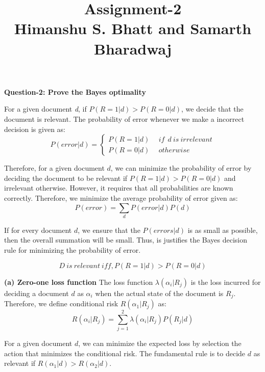 \documentclass[10pt,onecolumn,letterpaper]{article}
\begin{document}
\title{Assignment-2\\
\small{Himanshu S. Bhatt and Samarth Bharadwaj}}
\maketitle
\noindent\textbf{Question-2: Prove the Bayes optimality}

For a given document \emph{d}, if $P(R=1|d) > P(R=0|d)$, we decide that the document is relevant. The probability of error whenever we make a incorrect decision is given as:
\begin{equation}
P(error|d) =\left\{ \begin{array}{cc}
                        P(R=1|d)  & \ \ if \ \  d ~is~ irrelevant \\
                        P(R=0|d)   & \ \ otherwise
                        \end{array} \right.
\end{equation}

\noindent Therefore, for a given document $d$, we can minimize the probability of error by deciding the document to be relevant if $P(R=1|d) > P(R=0|d)$ and irrelevant otherwise. However, it requires that all probabilities are known correctly. Therefore, we minimize the average probability of error given as:
\begin{equation}
P(error)= \sum_d P(error|d) P(d)
\end{equation}

\noindent If for every document $d$, we ensure that the $P(errors|d)$ is as small as possible, then the overall summation will be small. Thus, is justifies the Bayes decision rule for minimizing the probability of error.

\begin{equation}
D ~is ~relevant ~iff, P(R=1|d) > P(R=0|d)
\end{equation}

\vspace{12pt}
\textbf{(a) Zero-one loss function}
The loss function $\lambda(\alpha_i|R_j)$ is the loss incurred for deciding a document $d$ as $\alpha_i$ when the actual state of the document is $R_j$.
Therefore, we define conditional risk $R(\alpha_1|R_j)$ as:
\begin{equation}
R(\alpha_i|R_j)=\sum_{j=1}^2 \lambda(\alpha_i|R_j) P(R_j|d)
\end{equation}

For a given document $d$, we can minimize the expected loss by selection the action that minimizes the conditional risk. The fundamental rule is to decide $d$ as relevant if $R(\alpha_1|d)>R(\alpha_2|d)$.
\end{document}
